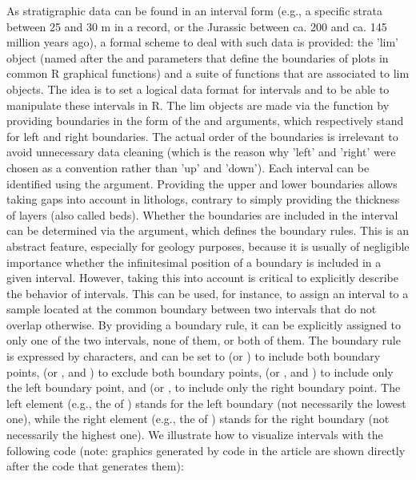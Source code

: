 As stratigraphic data can be found in an interval form (e.g., a specific strata between 25 and 30 m in a record, or the Jurassic between ca. 200 and ca. 145 million years ago), a formal scheme to deal with such data is provided: the 'lim' object (named after the  and  parameters that define the boundaries of plots in common R graphical functions) and a suite of functions that are associated to lim objects. The idea is to set a logical data format for intervals and to be able to manipulate these intervals in R. The lim objects are made via the  function by providing boundaries in the form of the  and  arguments, which respectively stand for left and right boundaries. The actual order of the boundaries is irrelevant to avoid unnecessary data cleaning (which is the reason why 'left' and 'right' were chosen as a convention rather than 'up' and 'down'). Each interval can be identified using the  argument. Providing the upper and lower boundaries allows taking gaps into account in lithologs, contrary to simply providing the thickness of layers (also called beds). Whether the boundaries are included in the interval can be determined via the  argument, which defines the boundary rules. This is an abstract feature, especially for geology purposes, because it is usually of negligible importance whether the infinitesimal position of a boundary is included in a given interval. However, taking this into account is critical to explicitly describe the behavior of intervals. This can be used, for instance, to assign an interval to a sample located at the common boundary between two intervals that do not overlap otherwise. By providing a boundary rule, it can be explicitly assigned to only one of the two intervals, none of them, or both of them. The boundary rule is expressed by characters, and can be set to  (or ) to include both boundary points, \code{"]["} (or , and ) to exclude both boundary points, \code{"[["} (or \code{"[)"},  and ) to include only the left boundary point, and \code{"]]"} (or \code{"(]"},  to include only the right boundary point. The left element (e.g., the \code{[} of ) stands for the left boundary (not necessarily the lowest one), while the right element (e.g., the \code{]} of ) stands for the right boundary (not necessarily the highest one). We illustrate how to visualize intervals with the following code (note: graphics generated by code in the article are shown directly after the code that generates them):

